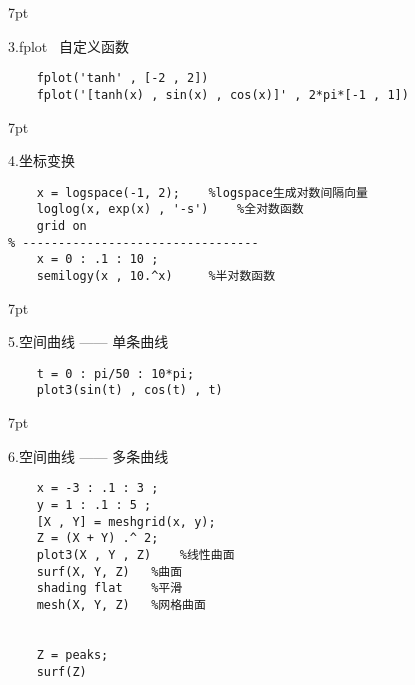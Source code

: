 \documentclass{article} %
\newenvironment{eg}{%
\def\FrameCommand{%
\hspace{1pt}%
{\color{Gray}\vrule width 2pt}%
{\color{egshade}\vrule width 4pt}%
\colorbox{egshade}%
}%
\MakeFramed{\advance\hsize-\width\FrameRestore}%
\noindent\hspace{-4.55pt}%
\begin{adjustwidth}{}{7pt}%
\vspace{2pt}\vspace{2pt}%
\normalfont %
}
{%
\vspace{2pt}\end{adjustwidth}\endMakeFramed%
}
\begin{document}
\begin{eg}
    3.fplot \ 自定义函数
\end{eg}
\begin{lstlisting}
    fplot('tanh' , [-2 , 2])
    fplot('[tanh(x) , sin(x) , cos(x)]' , 2*pi*[-1 , 1])
\end{lstlisting}

\begin{eg}
    4.坐标变换
\end{eg}
\begin{lstlisting}
    x = logspace(-1, 2);    %logspace生成对数间隔向量
    loglog(x, exp(x) , '-s')    %全对数函数
    grid on
% ---------------------------------
    x = 0 : .1 : 10 ;
    semilogy(x , 10.^x)     %半对数函数
\end{lstlisting}

\begin{eg}
    5.空间曲线 —— 单条曲线
\end{eg}
\begin{lstlisting}
    t = 0 : pi/50 : 10*pi;
    plot3(sin(t) , cos(t) , t)
\end{lstlisting}

\begin{eg}
    6.空间曲线 —— 多条曲线
\end{eg}
\begin{lstlisting}
    x = -3 : .1 : 3 ;
    y = 1 : .1 : 5 ;
    [X , Y] = meshgrid(x, y);
    Z = (X + Y) .^ 2;
    plot3(X , Y , Z)    %线性曲面
    surf(X, Y, Z)   %曲面
    shading flat    %平滑
    mesh(X, Y, Z)   %网格曲面
    

    Z = peaks;
    surf(Z)
\end{lstlisting}
\end{document}
